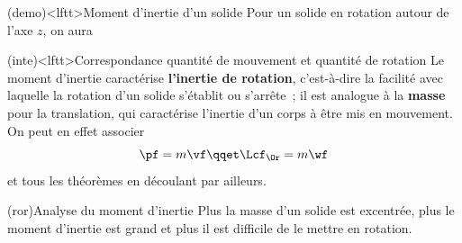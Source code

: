 \documentclass[../../main/main.tex]{subfiles}
\begin{document}
\begin{tcb*}(demo)<lftt>{Moment d'inertie d'un solide}
	Pour un solide en rotation autour de l'axe $z$, on aura
	\smallbreak
	\begin{isd}[sidebyside align=top]
		\tcblower
	\end{isd}
\end{tcb*}

\begin{tcb*}(inte)<lftt>{Correspondance quantité de mouvement et quantité de
			rotation}
	Le moment d'inertie caractérise \textbf{l'inertie de rotation}, c'est-à-dire
	la facilité avec laquelle la rotation d'un solide s'établit ou s'arrête~; il
	est analogue à la \textbf{masse} pour la translation, qui caractérise
	l'inertie d'un corps à être mis en mouvement. On peut en effet associer
	\[
		\pf = m\vf
		\qqet
		\Lcf_{\Or} = m\wf
	\]
	et tous les théorèmes en découlant par ailleurs.
\end{tcb*}

\begin{tcb*}(ror){Analyse du moment d'inertie}
	Plus la masse d'un solide est excentrée, plus le moment d'inertie
	est grand et plus il est difficile de le mettre en rotation.
\end{tcb*}
\end{document}
